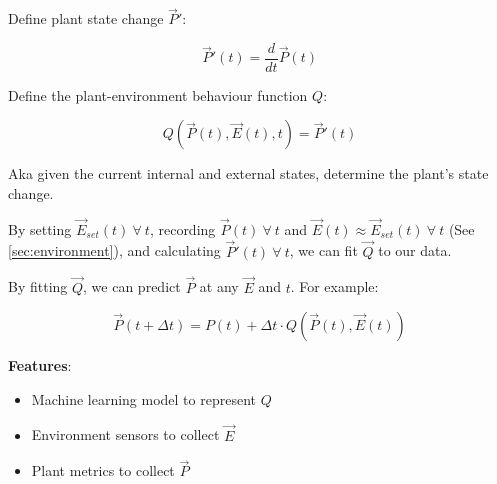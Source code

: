 \documentclass{report}
\begin{document}
Define plant state change $\vec P'$: 

$$\vec P'(t) = \frac{d}{dt}\vec P(t)$$

Define the plant-environment behaviour function $Q$: 

$$Q(\vec P(t), \vec E(t), t)=\vec P'(t)$$ 

Aka given the current internal and external states, determine the plant's state change.

By setting $\vec E_{set}(t)~\forall~ t$, recording $\vec P(t)~\forall~ t$ and $\vec E(t)\approx \vec E_{set}(t)~\forall~ t$ (See \ref{sec:environment}), and calculating $\vec P'(t)~\forall~ t$, we can fit $\vec Q$ to our data.

By fitting $\vec Q$, we can predict $\vec P$ at any $\vec E$ and $t$. For example:

$$\vec P(t+\Delta t)=P(t)+\Delta t\cdot Q(\vec P(t),\vec E(t))$$

\textbf{Features}:
\begin{itemize}
    \item Machine learning model to represent $Q$
    \item Environment sensors to collect $\vec E$
    \item Plant metrics to collect $\vec P$
\end{itemize}

\newpage









\end{document}
